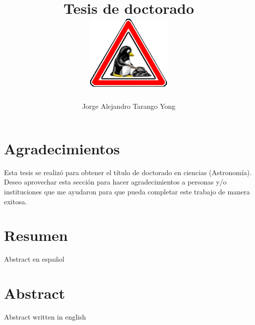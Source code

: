 \documentclass[11pt, twoside]{book}
\title{Tesis de doctorado\\
\includegraphics[width=0.1\linewidth]{./Figures/tux-development}
}
\author{Jorge Alejandro Tarango Yong}
\begin{document}
\maketitle
\pagestyle{empty}

\tableofcontents
\newpage
\section*{Agradecimientos}

Esta tesis se realizó para obtener el título de doctorado en 
ciencias (Astronomía). Deseo aprovechar esta sección para hacer
agradecimientos a personas y/o instituciones que me ayudaron para que 
pueda completar este trabajo de manera exitosa.
\newpage
\section*{Resumen}
  Abstract en español

\newpage
\section*{Abstract}
  Abstract written in english

\newpage

  

\pagestyle{fancy}
\fancyhf{}
\fancyhead[LE]{\footnotesize \thepage \quad\leftmark}
\fancyhead[RO]{\footnotesize \rightmark \quad\thepage}








\newpage

\end{document}

